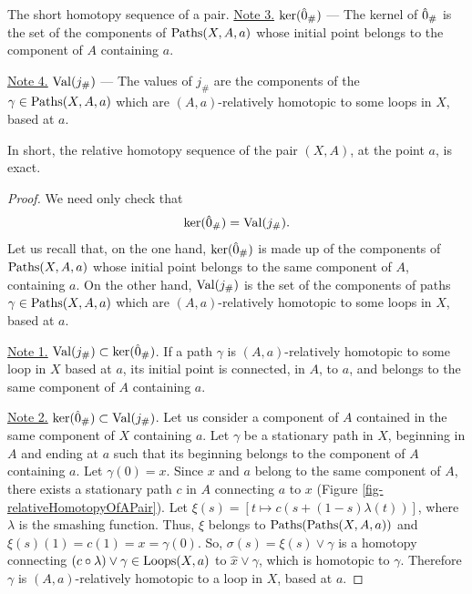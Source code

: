 \begin{Article}{The short homotopy sequence of a pair.}{}
  \uline{Note 3.} $\mathrm{ker}(\hat 0_\#)$ --- The kernel of $\hat 0_\#$ is the set of the components of $\operatorname{Paths}(X,A,a)$ whose initial point belongs to the component of $A$ containing $a$.

  \uline{Note 4.} $\operatorname{Val}(j_\#)$ --- The values of $j_\#$ are the components of the $\gamma \in \operatorname{Paths}(X,A,a)$  which are $(A,a)$-relatively homotopic to some loops in $X$, based at $a$.

  In short,
  the relative homotopy sequence of the pair $(X,A)$,
  at the point $a$, is exact.
\end{Article} %

\begin{proof}
  We need only check that
  $$%
  \ker(\0_\#) = \Val(j_\#).
  $$%
  Let us recall that,
  on the one hand,
  $\mathrm{ker}(\hat 0_\#)$ is made up of the components of $\operatorname{Paths}(X,A,a)$ whose initial point belongs to the same component of $A$,
  containing $a$.
  On the other hand, $\operatorname{Val}(j_\#)$ is the set of the components of paths $\gamma \in \operatorname{Paths}(X,A,a)$ which are $(A,a)$-relatively homotopic to some loops in $X$,
  based at $a$.

  \uline{Note 1.} $\operatorname{Val}(j_\#) \subset \mathrm{ker}(\hat 0_\#)$.
  If a path $\gamma$ is $(A,a)$-relatively homotopic to some loop in $X$ based at $a$,
  its initial point is connected,
  in $A$,
  to $a$,
  and belongs to the same component of $A$ containing $a$.

  \uline{Note 2.} $\mathrm{ker}(\hat 0_\#) \subset \operatorname{Val}(j_\#)$.
  Let us consider a component of $A$ contained in the same component of $X$ containing $a$.
  Let $\gamma$ be a stationary path in $X$,
  beginning in $A$ and ending at $a$ such that its beginning belongs to the component of $A$ containing $a$.
  Let $\gamma(0) = x$.
  Since $x$ and $a$ belong to the same component of $A$,
  there exists a stationary path $c$ in $A$ connecting $a$ to $x$ (Figure \ref{fig-relativeHomotopyOfAPair}).
  Let $\xi(s) = [t \mapsto c(s + (1-s)\lambda(t))]$,
  where $\lambda$ is the smashing function.
  Thus,
  $\xi$ belongs to $\operatorname{Paths}(\operatorname{Paths}(X,A,a))$ and $\xi(s)(1) = c(1) = x = \gamma(0)$.
  So,
  $\sigma(s) = \xi(s) \vee \gamma$ is a homotopy connecting $(c \circ \lambda) \vee \gamma \in \operatorname{Loops}(X,a)$ to $\hat x \vee \gamma$,
  which is homotopic to $\gamma$.
  Therefore $\gamma$ is $(A,a)$-relatively homotopic to a loop in $X$,
  based at $a$.
\end{proof}

